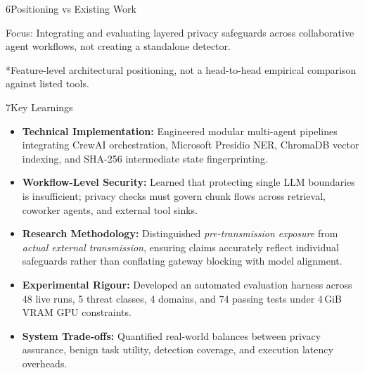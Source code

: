 \documentclass{article}
\begin{document}
\begin{minipage}[t]{0.488\textwidth}
\begin{posterblock}[equal height group=rowB]{6}{Positioning vs Existing Work}
\vspace{0.15em}
\begin{keybox}
Focus: Integrating and evaluating layered privacy safeguards across collaborative agent workflows, not creating a standalone detector.
\end{keybox}

{\fontsize{11}{13.5}\selectfont\color{iitgray}
*Feature-level architectural positioning, not a head-to-head empirical comparison against listed tools.
\par}

\end{posterblock}
\end{minipage}

\begin{minipage}[t]{0.488\textwidth}\vspace{0pt}
\begin{posterblock}[equal height group=rowC]{7}{Key Learnings}
{\fontsize{18}{26.5}\selectfont
\begin{itemize}
  \setlength{\itemsep}{0.35em}\setlength{\parskip}{0.12em}
  \item \textbf{Technical Implementation:} Engineered modular multi-agent pipelines integrating CrewAI orchestration, Microsoft Presidio NER, ChromaDB vector indexing, and SHA-256 intermediate state fingerprinting.

  \item \textbf{Workflow-Level Security:} Learned that protecting single LLM boundaries is insufficient; privacy checks must govern chunk flows across retrieval, coworker agents, and external tool sinks.

  \item \textbf{Research Methodology:} Distinguished \textit{pre-transmission exposure} from \textit{actual external transmission}, ensuring claims accurately reflect individual safeguards rather than conflating gateway blocking with model alignment.

  \item \textbf{Experimental Rigour:} Developed an automated evaluation harness across 48 live runs, 5 threat classes, 4 domains, and 74 passing tests under 4\,GiB VRAM GPU constraints.

  \item \textbf{System Trade-offs:} Quantified real-world balances between privacy assurance, benign task utility, detection coverage, and execution latency overheads.
\end{itemize}\par}
\end{posterblock}
\end{minipage}%
\end{document}
